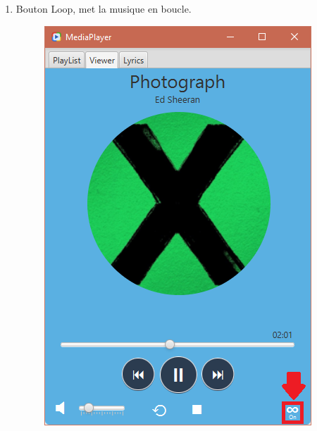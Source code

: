 \documentclass[a4paper,12pt]{report} %
\begin{document}
\begin{enumerate}
		\newpage
		\item Bouton Loop, met la musique en boucle.
   			\begin{figure}[ht] 		
				\centering
  				\includegraphics[scale=0.6]{loop}
			\end{figure}		
			

\end{enumerate}
\end{document}
